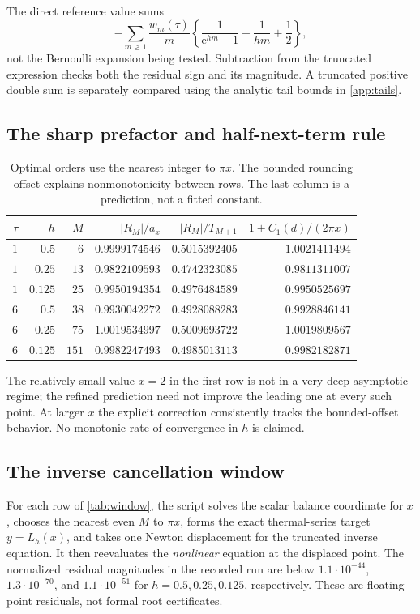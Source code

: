 \documentclass[11pt,a4paper]{article}
\newcommand{\ee}{\mathrm e}
\numberwithin{equation}{section}
\theoremstyle{plain}
\theoremstyle{definition}
\theoremstyle{remark}
\begin{document}
The direct reference value sums
\begin{equation}
 -\sum_{m\ge1}\frac{w_m(\tau)}m
 \left\{\frac1{\ee^{hm}-1}-\frac1{hm}+\frac12\right\},
 \label{eq:thermalreference}
\end{equation}
not the Bernoulli expansion being tested. Subtraction from the truncated
expression checks both the residual sign and its magnitude. A truncated
positive double sum is separately compared using the analytic tail bounds in
\cref{app:tails}.

\subsection{The sharp prefactor and half-next-term rule}
\begin{table}[htbp]
\centering
\begin{tabular}{@{}rrrrrr@{}}
\toprule
$\tau$ & $h$ & $M$ & $|R_M|/a_x$ & $|R_M|/T_{M+1}$ & $1+C_1(d)/(2\pi x)$\\
\midrule
$1$ & $0.5$ & $6$ & $0.9999174546$ & $0.5015392405$ & $1.0021411494$\\
$1$ & $0.25$ & $13$ & $0.9822109593$ & $0.4742323085$ & $0.9811311007$\\
$1$ & $0.125$ & $25$ & $0.9950194354$ & $0.4976484589$ & $0.9950525697$\\
$6$ & $0.5$ & $38$ & $0.9930042272$ & $0.4928088283$ & $0.9928846141$\\
$6$ & $0.25$ & $75$ & $1.0019534997$ & $0.5009693722$ & $1.0019809567$\\
$6$ & $0.125$ & $151$ & $0.9982247493$ & $0.4985013113$ & $0.9982182871$\\
\bottomrule
\end{tabular}
\caption{Optimal orders use the nearest integer to $\pi x$. The bounded
rounding offset explains nonmonotonicity between rows. The last column is a
prediction, not a fitted constant.}
\label{tab:optimal}
\end{table}

The relatively small value $x=2$ in the first row is not in a very deep
asymptotic regime; the refined prediction need not improve the leading one
at every such point. At larger $x$ the explicit correction consistently
tracks the bounded-offset behavior. No monotonic rate of convergence in $h$
is claimed.

\subsection{The inverse cancellation window}
For each row of \cref{tab:window}, the script solves the scalar balance
coordinate for $x$, chooses the nearest even $M$ to $\pi x$, forms the exact
thermal-series target $y=L_h(x)$, and takes one Newton displacement for the
truncated inverse equation. It then reevaluates the \emph{nonlinear} equation
at the displaced point. The normalized residual magnitudes in the recorded
run are below $1.1\cdot10^{-44}$, $1.3\cdot10^{-70}$, and
$1.1\cdot10^{-51}$ for $h=0.5,0.25,0.125$, respectively. These are
floating-point residuals, not formal root certificates.
\end{document}
